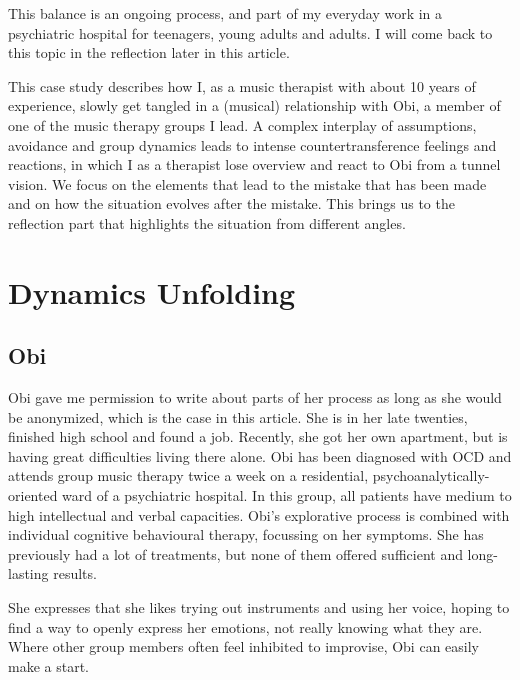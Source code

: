 \documentclass[authordate, empirical]{jote-new-article}
\begin{document}
This balance is an ongoing process, and part of my everyday work in a psychiatric hospital for teenagers, young adults and adults. I will come back to this topic in the reflection later in this article.



This case study describes how I, as a music therapist with about 10 years of experience, slowly get tangled in a (musical) relationship with Obi, a member of one of the music therapy groups I lead. A complex interplay of assumptions, avoidance and group dynamics leads to intense countertransference feelings and reactions, in which I as a therapist lose overview and react to Obi from a tunnel vision. We focus on the elements that lead to the mistake that has been made and on how the situation evolves after the mistake. This brings us to the reflection part that highlights the situation from different angles.







\section{Dynamics Unfolding}



\subsection{Obi}
Obi gave me permission to write about parts of her process as long as she would be anonymized, which is the case in this article. She is in her late twenties, finished high school and found a job. Recently, she got her own apartment, but is having great difficulties living there alone. Obi has been diagnosed with OCD and attends group music therapy twice a week on a residential, psychoanalytically-oriented ward of a psychiatric hospital. In this group, all patients have medium to high intellectual and verbal capacities. Obi's explorative process is combined with individual cognitive behavioural therapy, focussing on her symptoms. She has previously had a lot of treatments, but none of them offered sufficient and long-lasting results.



She expresses that she likes trying out instruments and using her voice, hoping to find a way to openly express her emotions, not really knowing what they are. Where other group members often feel inhibited to improvise, Obi can easily make a start.
\end{document}
